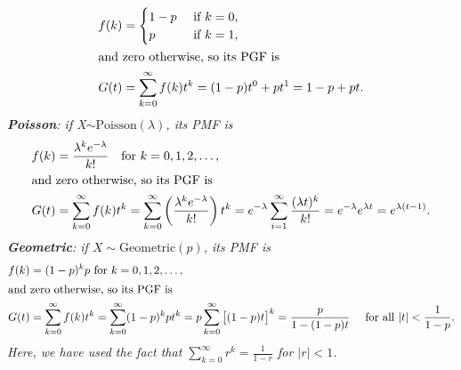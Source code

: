 \begin{example}
\begin{align*}
f(k) & = \begin{cases} 1-p & \text{ if }k=0, \\ p & \text{ if }k=1,\end{cases} \\
\intertext{and zero otherwise, so its PGF is}
G(t) & = \sum_{k=0}^\infty f(k) t^k = (1-p)t^0 + pt^1 = 1 - p + pt.  \\
\end{align*}
\it \textbf{Poisson}: if X$\sim\text{Poisson}(\lambda)$, its PMF is 
\begin{align*}
f(k) & = \displaystyle\frac{\lambda^k e^{-\lambda}}{k!} \quad\text{for } k=0,1,2,\ldots, \\
\intertext{and zero otherwise, so its PGF is}
G(t) & = \sum_{k=0}^\infty f(k) t^k
		= \sum_{k=0}^{\infty}\left(\frac{\lambda^k e^{-\lambda}}{k!}\right)t^k
		= e^{-\lambda}\sum_{i=1}^\infty \frac{(\lambda t)^k}{k!}
		= e^{-\lambda}e^{\lambda t}
		= e^{\lambda(t-1)}. \\
\end{align*}
\it \textbf{Geometric}: if $X\sim\text{Geometric}(p)$, its PMF is
\begin{align*}
f(k) & = (1-p)^k p \text{ for } k=0,1,2,\ldots, \\
\intertext{and zero otherwise, so its PGF is}
G(t) & = \sum_{k=0}^\infty f(k) t^k
		= \sum_{k=0}^\infty (1-p)^k p t^k 
		= p\sum_{k=0}^\infty \big[(1-p)t\big]^k 
		= \frac{p}{1-(1-p)t} \quad\text{ for all } |t|<\frac{1}{1-p}.
\end{align*}
Here, we have used the fact that $\displaystyle\sum_{k=0}^{\infty} r^k = \frac{1}{1-r}$ for $|r|<1$.
\een
\end{example}

